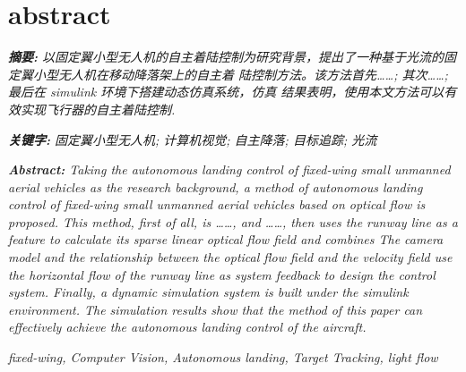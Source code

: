 \chapter{abstract}
\begin{adjustwidth}{0cm}{0cm}
    \emph{\textbf{摘\hspace{0.5em}要:} 以固定翼小型无人机的自主着陆控制为研究背景，提出了一种基于光流的固定翼小型无人机在移动降落架上的自主着
    陆控制方法。该方法首先\dots\dots; 其次\dots \dots; 最后在 simulink 环境下搭建动态仿真系统，仿真
    结果表明，使用本文方法可以有效实现飞行器的自主着陆控制. 
    }
    \begin{flushleft}
    \emph{{\textbf{关键字:}} 固定翼小型无人机; 计算机视觉; 自主降落; 目标追踪; 光流}
    \end{flushleft}
\end{adjustwidth}
\begin{adjustwidth}{0cm}{0cm}
    \emph{\textbf{Abstract:}
    Taking the autonomous landing control of fixed-wing small unmanned aerial vehicles as the research background, 
    a method of autonomous landing control of fixed-wing small unmanned aerial vehicles based on optical flow is proposed. 
    This method, first of all, is \dots \dots, and \dots \dots, then uses the runway line as a feature to calculate its sparse linear optical flow field and combines The camera model and the relationship between the optical flow field and the velocity field use the horizontal flow of the runway line as system feedback to design the control system. Finally, a dynamic simulation system is built under the simulink environment. The simulation results show that the method of this paper can effectively achieve the autonomous landing control of the aircraft.}\par
\end{adjustwidth}
\begin{keywords}
    \emph{\noindent fixed-wing, Computer Vision, Autonomous landing, Target Tracking, light flow}
\end{keywords}